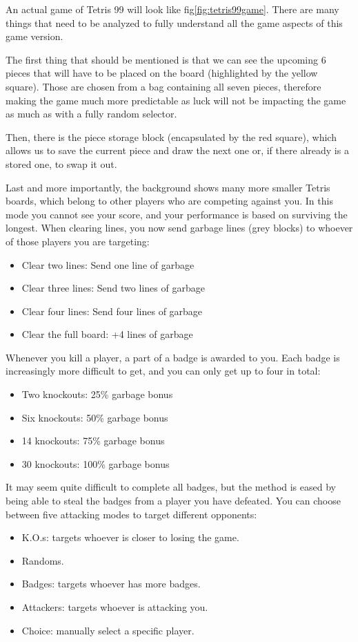 An actual game of Tetris 99 will look like fig\ref{fig:tetris99game}.
There are many things that need to be analyzed to fully understand all the game aspects of this game version.

The first thing that should be mentioned is that we can see the upcoming 6 pieces that will have to be placed on the board (highlighted by the yellow square). Those are chosen from a bag containing all seven pieces, therefore making the game much more predictable as luck will not be impacting the game as much as with a fully random selector.

Then, there is the piece storage block (encapsulated by the red square), which allows us to save the current piece and draw the next one or, if there already is a stored one, to swap it out.

Last and more importantly, the background shows many more smaller Tetris boards, which belong to other players who are competing against you. In this mode you cannot see your score, and your performance is based on surviving the longest. When clearing lines, you now send garbage lines (grey blocks) to whoever of those players you are targeting:
\begin{itemize}
	\item	Clear two lines: Send one line of garbage
	\item	Clear three lines: Send two lines of garbage
	\item	Clear four lines: Send four lines of garbage
	\item	Clear the full board: +4 lines of garbage
\end{itemize}

Whenever you kill a player, a part of a badge is awarded to you. Each badge is increasingly more difficult to get, and you can only get up to four in total:
\begin{itemize}
   \item	Two knockouts: 25\% garbage bonus
   \item	Six knockouts:   50\% garbage bonus
   \item	14 knockouts:    75\% garbage bonus
   \item	30 knockouts:    100\% garbage bonus
\end{itemize}

It may seem quite difficult to complete all badges, but the method is eased by being able to steal the badges from a player you have defeated.
You can choose between five attacking modes to target different opponents:
\begin{itemize}
   \item	K.O.s: targets whoever is closer to losing the game.
   \item	Randoms.
   \item	Badges: targets whoever has more badges.
   \item	Attackers: targets whoever is attacking you.
   \item	Choice: manually select a specific player.
\end{itemize}

